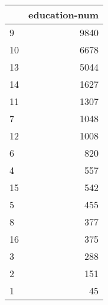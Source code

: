 \begin{tabular}{lr}
\toprule
{} &  education-num \\
\midrule
9  &           9840 \\
10 &           6678 \\
13 &           5044 \\
14 &           1627 \\
11 &           1307 \\
7  &           1048 \\
12 &           1008 \\
6  &            820 \\
4  &            557 \\
15 &            542 \\
5  &            455 \\
8  &            377 \\
16 &            375 \\
3  &            288 \\
2  &            151 \\
1  &             45 \\
\bottomrule
\end{tabular}

